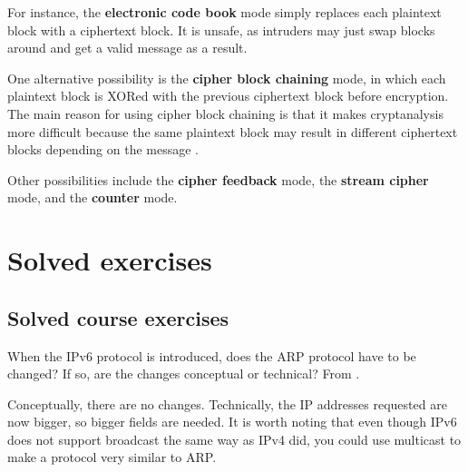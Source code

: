 \documentclass[12pt, oneside]{book}
\begin{document}
For instance, the \textbf{electronic code book} mode simply replaces each plaintext block with a ciphertext block.
It is unsafe, as intruders may just swap blocks around and get a valid message as a result.

One alternative possibility is the \textbf{cipher block chaining} mode, in which each plaintext block is XORed with the previous ciphertext block before encryption.
The main reason for using cipher block chaining is that it makes cryptanalysis more difficult because the same plaintext block may result in different ciphertext blocks depending on the message \cite[p.~789]{computer-networks-tanenbaum-2012}.

Other possibilities include the \textbf{cipher feedback} mode, the \textbf{stream cipher} mode, and the \textbf{counter} mode.

\section{Solved exercises}

\subsection{Solved course exercises}
\setcounter{Exercise}{0}

\begin{Exercise}
When the IPv6 protocol is introduced, does the ARP protocol have to be changed?
If so, are the changes conceptual or technical?
From \cite{computer-networks-tanenbaum-2012}.
\end{Exercise}
\begin{Answer}
Conceptually, there are no changes.
Technically, the IP addresses requested are now bigger, so bigger fields are needed.
It is worth noting that even though IPv6 does not support broadcast the same way as IPv4 did, you could use multicast to make a protocol very similar to ARP.
\end{Answer}
\end{document}
